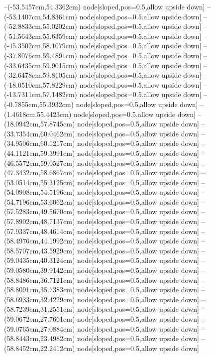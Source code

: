 --(-53.5457cm,54.3362cm) node[sloped,pos=0.5,allow upside down]{\ArrowIn}
--(-53.1407cm,54.8361cm) node[sloped,pos=0.5,allow upside down]{\arrowIn}
--(-52.8833cm,55.0202cm) node[sloped,pos=0.5,allow upside down]{\arrowIn}
--(-51.5643cm,55.6359cm) node[sloped,pos=0.5,allow upside down]{\ArrowIn}
--(-45.3502cm,58.1079cm) node[sloped,pos=0.5,allow upside down]{\ArrowIn}
--(-37.8076cm,59.4891cm) node[sloped,pos=0.5,allow upside down]{\ArrowIn}
--(-33.6435cm,59.9015cm) node[sloped,pos=0.5,allow upside down]{\ArrowIn}
--(-32.6478cm,59.8105cm) node[sloped,pos=0.5,allow upside down]{\arrowIn}
--(-18.0510cm,57.8229cm) node[sloped,pos=0.5,allow upside down]{\ArrowIn}
--(-13.7311cm,57.1482cm) node[sloped,pos=0.5,allow upside down]{\ArrowIn}
--(-0.7855cm,55.3932cm) node[sloped,pos=0.5,allow upside down]{\ArrowIn}
--(1.4618cm,55.4423cm) node[sloped,pos=0.5,allow upside down]{\ArrowIn}
--(18.0942cm,57.8745cm) node[sloped,pos=0.5,allow upside down]{\ArrowIn}
--(33.7354cm,60.0462cm) node[sloped,pos=0.5,allow upside down]{\ArrowIn}
--(34.9506cm,60.1217cm) node[sloped,pos=0.5,allow upside down]{\ArrowIn}
--(44.1121cm,59.3991cm) node[sloped,pos=0.5,allow upside down]{\ArrowIn}
--(46.5572cm,59.0527cm) node[sloped,pos=0.5,allow upside down]{\ArrowIn}
--(47.3432cm,58.6867cm) node[sloped,pos=0.5,allow upside down]{\arrowIn}
--(53.0514cm,55.3125cm) node[sloped,pos=0.5,allow upside down]{\ArrowIn}
--(54.0908cm,54.5196cm) node[sloped,pos=0.5,allow upside down]{\ArrowIn}
--(54.7196cm,53.6062cm) node[sloped,pos=0.5,allow upside down]{\ArrowIn}
--(57.5283cm,49.5670cm) node[sloped,pos=0.5,allow upside down]{\ArrowIn}
--(57.8902cm,48.7137cm) node[sloped,pos=0.5,allow upside down]{\arrowIn}
--(57.9337cm,48.4614cm) node[sloped,pos=0.5,allow upside down]{\arrowIn}
--(58.4976cm,44.1992cm) node[sloped,pos=0.5,allow upside down]{\ArrowIn}
--(58.5707cm,43.5929cm) node[sloped,pos=0.5,allow upside down]{\arrowIn}
--(59.0435cm,40.3124cm) node[sloped,pos=0.5,allow upside down]{\ArrowIn}
--(59.0580cm,39.9142cm) node[sloped,pos=0.5,allow upside down]{\arrowIn}
--(58.8486cm,36.7121cm) node[sloped,pos=0.5,allow upside down]{\ArrowIn}
--(58.8091cm,35.7383cm) node[sloped,pos=0.5,allow upside down]{\arrowIn}
--(58.6933cm,32.4229cm) node[sloped,pos=0.5,allow upside down]{\ArrowIn}
--(58.7239cm,31.2551cm) node[sloped,pos=0.5,allow upside down]{\ArrowIn}
--(59.0672cm,27.7661cm) node[sloped,pos=0.5,allow upside down]{\ArrowIn}
--(59.0765cm,27.0884cm) node[sloped,pos=0.5,allow upside down]{\arrowIn}
--(58.8443cm,23.4982cm) node[sloped,pos=0.5,allow upside down]{\ArrowIn}
--(58.8452cm,22.2412cm) node[sloped,pos=0.5,allow upside down]{\ArrowIn}
